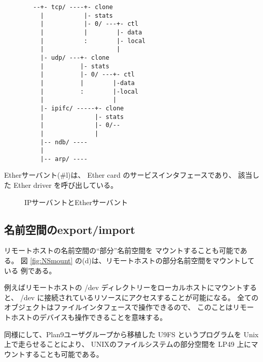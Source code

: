 \documentclass[draft]{ipsjpapers}
\begin{document}
{\footnotesize
\begin{verbatim}
        --+- tcp/ ----+- clone                        
          |           |- stats                
          |           |- 0/ ---+- ctl          
          |           |        |- data     
          |           :        |- local    
          |                    |           
          |- udp/ ---+- clone                        
          |          |- stats                  
          |          |- 0/ ---+- ctl            
          |          |        |-data     
          |          :        |-local    
          |                   |           
          |- ipifc/ -----+- clone                         
          |              |- stats                   
          |              |- 0/--                    
          |              |                          
          |-- ndb/ ----                                   
          |                                              
          |-- arp/ ----
\end{verbatim}
}


Etherサーバント(\#l)は、 Ether card のサービスインタフェースであり、
該当した Ether driver を呼び出している。


\begin{figure}[htb]
  \begin{center}
   \epsfxsize=420pt
    \caption{IPサーバントとEtherサーバント}
    \label{fig:NWservants}
  \end{center}
\end{figure}


\subsection{名前空間のexport/import}

  
リモートホストの名前空間の``部分''名前空間を
マウントすることも可能である。
図 \ref{fig:NSmount} の(d)は、リモートホストの部分名前空間をマウントしている
例である。

例えばリモートホストの /dev ディレクトリーをローカルホストにマウントすると、
/dev に接続されているリソースにアクセスすることが可能になる。
全てのオブジェクトはファイルインタフェースで操作できるので、
このことはリモートホストのデバイスも操作できることを意味する。


同様にして、Plan9ユーザグループから移植した U9FS というプログラムを
Unix上で走らせることにより、
UNIXのファイルシステムの部分空間を LP49 上にマウントすることも可能である。
\end{document}
